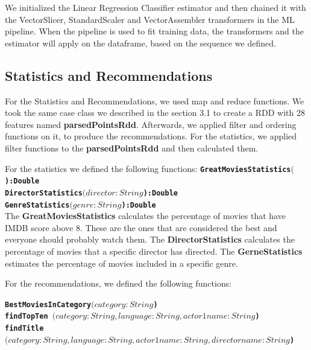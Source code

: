 \documentclass[letterpaper,twocolumn,10pt]{article}
\begin{document}
We initialized the Linear Regression Classifier estimator and then chained it with the VectorSlicer, StandardScaler and VectorAssembler transformers in the ML pipeline. When the pipeline is used to fit training data, the transformers and the estimator will apply on the dataframe, based on the sequence we defined.\par 

\subsection{Statistics and Recommendations}

For the Statistics and Recommendations, we used map and reduce functions. We took the same case class we described in the section 3.1 to create a RDD with 28 features named \textbf{parsedPointsRdd}. Afterwards, we applied filter and ordering functions on it, to produce the recommendations. For the statistics, we applied filter functions to the \textbf{parsedPointsRdd} and then calculated them. \par 

For the statistics we defined the following functions:
\noindent
{\bf \tt GreatMoviesStatistics\((\)):Double } \\ 

\noindent
{\bf \tt DirectorStatistics\((director:String\)):Double } \\ 

\noindent
{\bf \tt GenreStatistics\((genre:String\)):Double } \\ 

The \textbf{GreatMoviesStatistics} calculates the percentage of movies that have IMDB score above 8. These are the ones that are considered the best and everyone should probably watch them. The \textbf{DirectorStatistics} calculates the percentage of movies that a specific director has directed. The \textbf{GerneStatistics} estimates the percentage of movies included in a specific genre. \par


For the recommendations, we defined the following functions:

\noindent
{\bf \tt BestMoviesInCategory\((category:String\)) } \\

\noindent
{\bf \tt findTopTen  \((category:String,language:String,actor1name:String\)) } \\

\noindent
{\bf \tt findTitle\((category:String, language:String, actor1name:String, directorname:String\)) } \\
\end{document}
